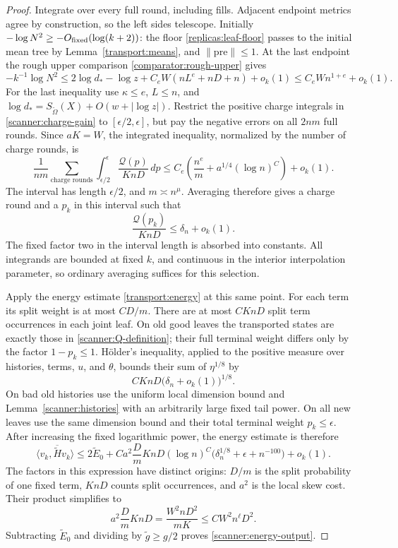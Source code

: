 \begin{proof}
Integrate over every full round, including fills.  Adjacent endpoint
metrics agree by construction, so the left sides telescope.  Initially
\(-\log N^2\ge-O_{\rm fixed}(\log(k+2))\): the floor
\eqref{replicas:leaf-floor} passes to the initial mean tree by
Lemma~\ref{transport:means}, and \(\|\mathrm{pre}\|\le1\).
At the last endpoint the rough
upper comparison \eqref{comparator:rough-upper} gives
\[
 -k^{-1}\log N^2
 \le 2\log d_*-\log z+C_eW(nL^e+nD+n)+o_k(1)
 \le C_eW n^{1+e}+o_k(1).
\]
For the last inequality use \(\kappa\le e\), \(L\le n\), and
\(\log d_*=S_{\widetilde\Omega}(X)+O(w+|\log z|)\).
Restrict the positive charge integrals in
\eqref{scanner:charge-gain} to \([\epsilon/2,\epsilon]\), but pay
the negative errors on all \(2nm\) full rounds.  Since \(aK=W\),
the integrated inequality, normalized by the number of charge rounds, is
\[
 \frac1{nm}\sum_{\text{charge rounds}}
  \int_{\epsilon/2}^{\epsilon}\frac{\mathcal Q(p)}{KnD}\,dp
 \le C_e\left(\frac{n^e}{m}+a^{1/4}(\log n)^C\right)+o_k(1).
\]
The interval has length \(\epsilon/2\), and \(m\asymp n^\mu\).
Averaging therefore gives a charge round and a \(p_k\) in this interval
such that
\begin{equation}
 \frac{\mathcal Q(p_k)}{KnD}\le\delta_n+o_k(1).
 \label{scanner:selected-density}
\end{equation}
The fixed factor two in the interval length is absorbed into constants.
All integrands are bounded at fixed \(k\), and continuous in the
interior interpolation parameter, so ordinary averaging suffices for
this selection.

Apply the energy estimate \eqref{transport:energy} at this same point.
For each term its split weight is at most \(CD/m\).  There are at
most \(CKnD\) split term occurrences in each joint leaf.  On old
good leaves the transported states are exactly those in
\eqref{scanner:Q-definition}; their full terminal weight differs only
by the factor \(1-p_k\le1\).  H\"older's inequality, applied to the
positive measure over histories, terms, \(u\), and \(\theta\), bounds
their sum of \(\eta^{1/8}\) by
\[
 CKnD\bigl(\delta_n+o_k(1)\bigr)^{1/8}.
\]
On bad old histories use the uniform local dimension bound and
Lemma~\ref{scanner:histories} with an arbitrarily large fixed tail
power.  On all new leaves use the same dimension bound and their
total terminal weight \(p_k\le\epsilon\).  After increasing the fixed
logarithmic power, the energy estimate is therefore
\[
 \langle v_k,\overline{\widetilde H}v_k\rangle
 \le 2\widetilde E_0+
 C a^2\frac Dm KnD(\log n)^C
       \bigl(\delta_n^{1/8}+\epsilon+n^{-100}\bigr)+o_k(1).
\]
The factors in this expression have distinct origins: \(D/m\) is the
split probability of one fixed term, \(KnD\) counts split occurrences,
and \(a^2\) is the local skew cost.  Their product simplifies to
\[
 a^2\frac Dm KnD
   =\frac{W^2nD^2}{mK}
   \le CW^2n^\ell D^2.
\]
Subtracting \(\widetilde E_0\) and dividing by
\(\widetilde g\ge g/2\) proves
\eqref{scanner:energy-output}.


\end{proof}
